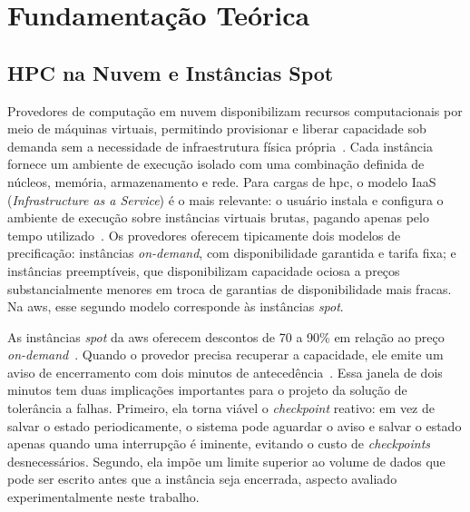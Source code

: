 \documentclass[a4paper,11pt]{article}
\begin{document}
    \section{Fundamentação Teórica}

        \subsection{HPC na Nuvem e Instâncias Spot}

            Provedores de computação em nuvem disponibilizam recursos computacionais
            por meio de máquinas virtuais, permitindo provisionar e liberar capacidade
            sob demanda sem a necessidade de infraestrutura física
            própria~\cite{mell2011nist}. Cada instância fornece um ambiente de execução
            isolado com uma combinação definida de núcleos, memória, armazenamento e
            rede. Para cargas de \gls{hpc}, o modelo IaaS (\textit{Infrastructure as a
            Service}) é o mais relevante: o usuário instala e configura o ambiente de
            execução sobre instâncias virtuais brutas, pagando apenas pelo tempo
            utilizado~\cite{netto2018hpccloud}. Os provedores oferecem tipicamente dois
            modelos de precificação: instâncias \textit{on-demand}, com disponibilidade
            garantida e tarifa fixa; e instâncias preemptíveis, que disponibilizam
            capacidade ociosa a preços substancialmente menores em troca de garantias
            de disponibilidade mais fracas. Na \gls{aws}, esse segundo modelo corresponde às
            instâncias \textit{spot}.

            As instâncias \textit{spot} da \gls{aws} oferecem descontos de 70 a 90\% em
            relação ao preço \textit{on-demand}~\cite{aws2018spot}. Quando o provedor
            precisa recuperar a capacidade, ele emite um aviso de encerramento com
            dois minutos de antecedência~\cite{aws2026spot_termination}. Essa janela
            de dois minutos tem duas implicações importantes para o projeto da solução
            de tolerância a falhas. Primeiro, ela torna viável o \textit{checkpoint}
            reativo: em vez de salvar o estado periodicamente, o sistema pode aguardar
            o aviso e salvar o estado apenas quando uma interrupção é iminente,
            evitando o custo de \textit{checkpoints} desnecessários. Segundo, ela
            impõe um limite superior ao volume de dados que pode ser escrito antes que
            a instância seja encerrada, aspecto avaliado experimentalmente neste
            trabalho.
\end{document}
